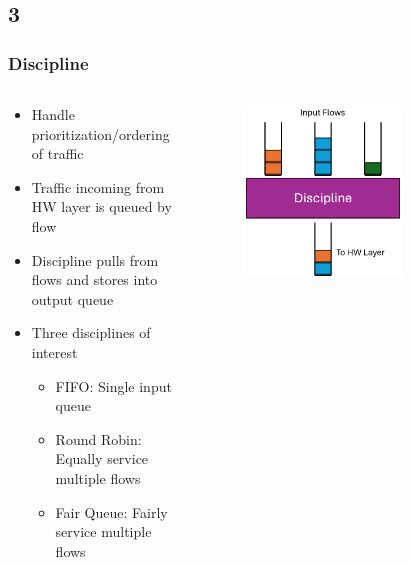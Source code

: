 \documentclass[compress]{beamer}
\begin{document}
    \subsection{3}
    \begin{frame}
        \frametitle{Discipline}
        \begin{columns}
            \begin{column}{0.5\textwidth}
                \begin{itemize}
                    \item Handle prioritization/ordering of traffic
                    \item Traffic incoming from HW layer is queued by flow
                    \item Discipline pulls from flows and stores into output queue
                    \item Three disciplines of interest
                    \begin{itemize}
                        \item FIFO: Single input queue
                        \item Round Robin: Equally service multiple flows
                        \item Fair Queue: Fairly service multiple flows
                    \end{itemize}
                \end{itemize}
            \end{column}

            \begin{column}{0.5\textwidth}
                \begin{figure}
                    \centering
                    \includegraphics[width=0.7\textwidth]{img/discipline}
                \end{figure}
            \end{column}
        \end{columns}
    \end{frame}
\end{document}
